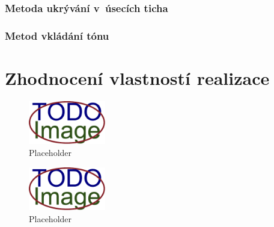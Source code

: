 \subsection*{Metoda ukrývání v~úsecích ticha}
\label{sub:hiding-in-silence-intervals-implementation}


\blindtext

\subsection*{Metod vkládání tónu}
\label{sub:tone-insertion-implementation}


\blindtext


\chapter{Zhodnocení vlastností realizace}
\label{cha:method-evaluation}


\blindtext

\blindtext

\begin{figure}[hbt]
    \centering
    \includegraphics[width=0.3\textwidth]{obrazky/placeholder.pdf}
    \caption{Placeholder}
    \label{pic:placeholder}
\end{figure}

\blindtext

\begin{figure}[hbt]
    \centering
    \includegraphics[width=0.3\textwidth]{obrazky/placeholder.pdf}
    \caption{Placeholder}
    \label{pic:placeholder}
\end{figure}

\blindtext

\blindtext

\blindtext

